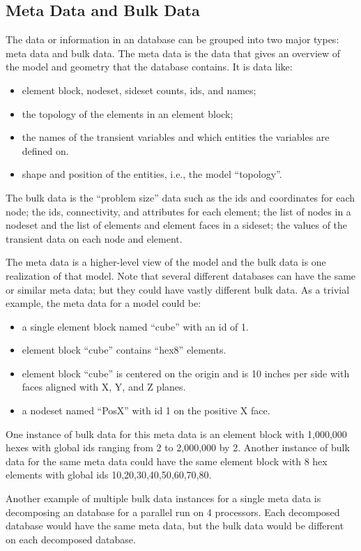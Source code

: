 \subsection{Meta Data and Bulk Data}
The data or information in an \exo{} database can be grouped into two
major types: meta data and bulk data.  The meta data is the data that
gives an overview of the model and geometry that the \exo{} database
contains. It is data like:
\begin{itemize}
\item element block, nodeset, sideset counts, ids, and names;
\item the topology of the elements in an element block;
\item the names of the transient variables and which entities the
	variables are defined on.  
\item shape and position of the entities, i.e., the model ``topology''.
\end{itemize}

The bulk data is the ``problem size'' data such as the ids and
coordinates for each node; the ids, connectivity, and attributes for
each element; the list of nodes in a nodeset and the list of elements
and element faces in a sideset; the values of the transient data on
each node and element.

The meta data is a higher-level view of the model and the bulk data is
one realization of that model.  Note that several different databases
can have the same or similar meta data; but they could have vastly
different bulk data.  As a trivial example, the meta data for a model
could be:
\begin{itemize}
\item a single element block named ``cube'' with an id of 1.
\item element block ``cube'' contains ``hex8'' elements.
\item element block ``cube'' is centered on the origin and is 10
inches per side with faces aligned with X, Y, and Z planes.
\item a nodeset named ``PosX'' with id 1 on the positive X face.
\end{itemize}

One instance of bulk data for this meta data is an element block with
1,000,000 hexes with global ids ranging from 2 to 2,000,000 by 2.
Another instance of bulk data for the same meta data could have the
same element block with 8 hex elements with global ids
10,20,30,40,50,60,70,80.

Another example of multiple bulk data instances for a single meta data
is decomposing an \exo{} database for a parallel run on 4 processors.
Each decomposed database would have the same meta data, but the bulk
data would be different on each decomposed database.

